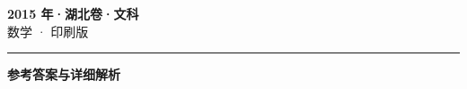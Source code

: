 \documentclass[zihao=5, a4paper]{ctexart}
\begin{document}
\begin{center}
  {\Large\bfseries 2015 年·湖北卷·文科}\\[4pt]
  {\large 数学 · 印刷版}
\end{center}
\medskip
{}

\par\bigskip\hrule\bigskip
{}
\begin{center}{\large\bfseries 参考答案与详细解析}\end{center}
\smallskip

\end{document}
